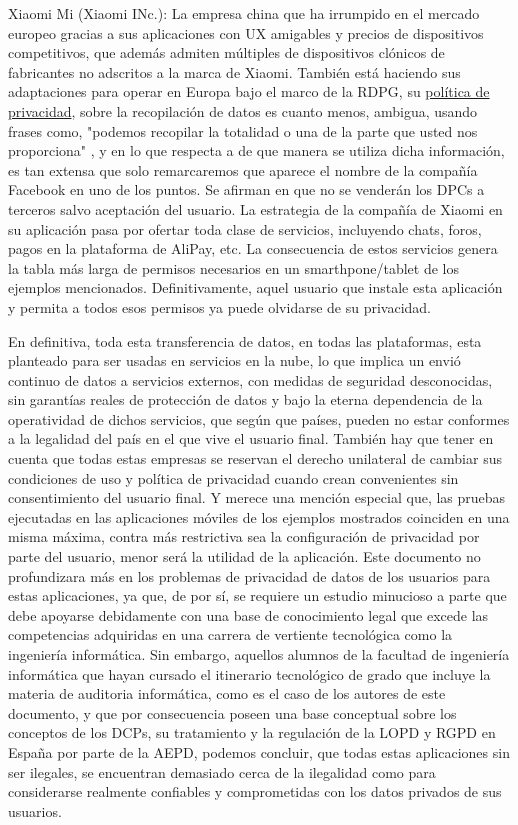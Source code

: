 Xiaomi Mi (Xiaomi INc.): La empresa china que ha irrumpido en el mercado europeo gracias a sus aplicaciones con UX amigables y precios de dispositivos competitivos, que además admiten múltiples de dispositivos clónicos de fabricantes no adscritos a la marca de Xiaomi. También está haciendo sus adaptaciones para operar en Europa bajo el marco de la RDPG, su \href{https://www.mi.com/es/about/privacy}{política de privacidad}, sobre la recopilación de datos es cuanto menos, ambigua, usando frases como, "podemos recopilar la totalidad o una de la parte que usted nos proporciona" , y en lo que respecta a de que manera se utiliza dicha información, es tan extensa que solo remarcaremos que aparece el nombre de la compañía Facebook en uno de los puntos. Se afirman en que no se venderán los DPCs a terceros salvo aceptación del usuario. La estrategia de la compañía de Xiaomi en su aplicación pasa por ofertar toda clase de servicios, incluyendo chats, foros, pagos en la plataforma de AliPay, etc. La consecuencia de estos servicios genera la tabla más larga de permisos necesarios en un smarthpone/tablet de los ejemplos mencionados. Definitivamente, aquel usuario que instale esta aplicación y permita a todos esos permisos ya puede olvidarse de su privacidad.

En definitiva, toda esta transferencia de datos, en todas las plataformas, esta planteado para ser usadas en servicios en la nube, lo que implica un envió continuo de datos a servicios externos, con medidas de seguridad desconocidas, sin garantías reales de protección de datos y bajo la eterna dependencia de la operatividad de dichos servicios, que según que países, pueden no estar conformes a la legalidad del país en el que vive el usuario final. También hay que tener en cuenta que todas estas empresas se reservan el derecho unilateral de cambiar sus condiciones de uso y política de privacidad cuando crean convenientes sin consentimiento del usuario final. Y merece una mención especial que, las pruebas ejecutadas en las aplicaciones móviles de los ejemplos mostrados coinciden en una misma máxima, contra más restrictiva sea la configuración de privacidad por parte del usuario, menor será la utilidad de la aplicación. Este documento no profundizara más en los problemas de privacidad de datos de los usuarios para estas aplicaciones, ya que, de por sí, se requiere un estudio minucioso a parte que debe apoyarse debidamente con una base de conocimiento legal que excede las competencias adquiridas en una carrera de vertiente tecnológica como la ingeniería informática. Sin embargo, aquellos alumnos de la facultad de ingeniería informática que hayan cursado el itinerario tecnológico de grado que incluye la materia de auditoria informática, como es el caso de los autores de este documento, y que por consecuencia poseen una base conceptual sobre los conceptos de los DCPs, su tratamiento y la regulación de la LOPD y RGPD en España por parte de la AEPD, podemos concluir, que todas estas aplicaciones sin ser ilegales, se encuentran demasiado cerca de la ilegalidad como para considerarse realmente confiables y comprometidas con los datos privados de sus usuarios.


